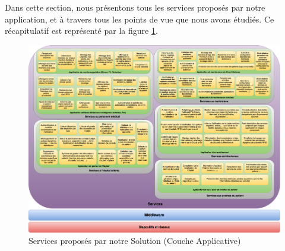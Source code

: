 Dans cette section, nous présentons tous les services proposés par notre application, et à travers tous les points de vue que nous avons étudiés. Ce récapitulatif est représenté par la figure \ref{recap}.
\newline
\begin{figure}[h!]
	\hspace*{-4.2cm}
	\centering
	\includegraphics[width=1.7\textwidth]{recapitulatif.png}
	\caption{Services proposés par notre Solution (Couche Applicative)}
	\label{recap}
\end{figure}
